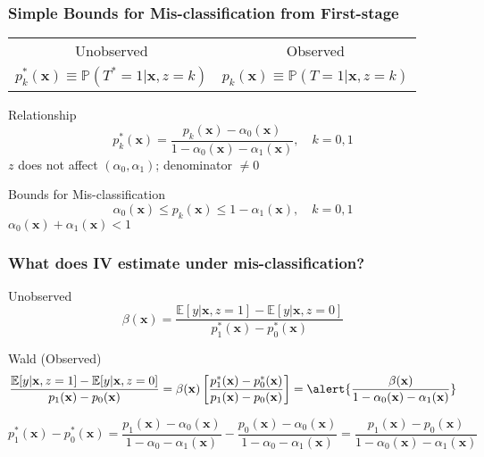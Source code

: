 \documentclass[handout]{beamer}
\begin{document}
\appendix
\begin{frame}[label=BOUNDS_APPEND]
  \frametitle{Simple Bounds for Mis-classification from First-stage} 

  \begin{table}[h]
    \centering
  \begin{tabular}[h]{|c|c|}
    \hline
   Unobserved & Observed \\
    $p^*_k(\mathbf{x}) \equiv \mathbb{P}(T^*=1|\mathbf{x}, z=k)$ & 
    $p_k(\mathbf{x}) \equiv \mathbb{P}(T=1|\mathbf{x}, z=k)$\\
    \hline
  \end{tabular}
\end{table}


  \begin{block}{Relationship}
    \vspace{-1em}
   \[
     p_k^*(\mathbf{x}) = \frac{p_k(\mathbf{x}) - \alpha_0(\mathbf{x})}{1 - \alpha_0(\mathbf{x}) - \alpha_1(\mathbf{x})}, \quad k = 0,1
   \]
   \hfill\alert{\footnotesize $z$ does not affect $(\alpha_0, \alpha_1)$; denominator $\neq 0$}
  \end{block}

  \normalsize
  \begin{block}{Bounds for Mis-classification}
    \vspace{-1em}
    \[
      \alpha_0(\mathbf{x}) \leq p_k(\mathbf{x}) \leq 1 - \alpha_1(\mathbf{x}), \quad k = 0,1
    \]
   \hfill \alert{\footnotesize$\alpha_0(\mathbf{x}) + \alpha_1(\mathbf{x}) <1$}
  \end{block}
    \hyperlink{BOUNDS_BODY}{}
\end{frame}
\begin{frame}[label=IV_APPEND]
  \frametitle{What does IV estimate under mis-classification?}
  \begin{block}{Unobserved}
  \[
    \beta(\mathbf{x}) = \frac{\mathbb{E}[y|\mathbf{x},z=1] - \mathbb{E}[y|\mathbf{x},z=0]}{p^*_1(\mathbf{x}) - p^*_0(\mathbf{x})} 
  \]
  \end{block}

  \begin{block}{Wald (Observed)}
    \vspace{-1em}
    \small
    \[
      \frac{\mathbb{E}[y|\mathbf{x},z=1] - \mathbb{E}[y|\mathbf{x},z=0]}{p_1(\mathbf{x}) - p_0(\mathbf{x})} = \beta(\mathbf{x})\left[ \frac{p_1^*(\mathbf{x}) - p_0^*(\mathbf{x})}{p_1(\mathbf{x}) - p_0(\mathbf{x})} \right] = \alert{\frac{\beta(\mathbf{x})}{1 - \alpha_0(\mathbf{x}) - \alpha_1(\mathbf{x})} }
    \]
   
    \vspace{2em}
    \scriptsize
    \[
      \boxed{p_1^*(\mathbf{x}) - p_0^*(\mathbf{x}) = \frac{p_1(\mathbf{x}) - \alpha_0(\mathbf{x})}{1 - \alpha_0 - \alpha_1(\mathbf{x})} -   \frac{p_0(\mathbf{x}) - \alpha_0(\mathbf{x})}{1 - \alpha_0 - \alpha_1(\mathbf{x})} = \frac{p_1(\mathbf{x}) - p_0(\mathbf{x})}{1 - \alpha_0(\mathbf{x}) - \alpha_1(\mathbf{x})}}
    \]
  \end{block}
    \hyperlink{BOUNDS_BODY}{}
\end{frame}
\end{document}
